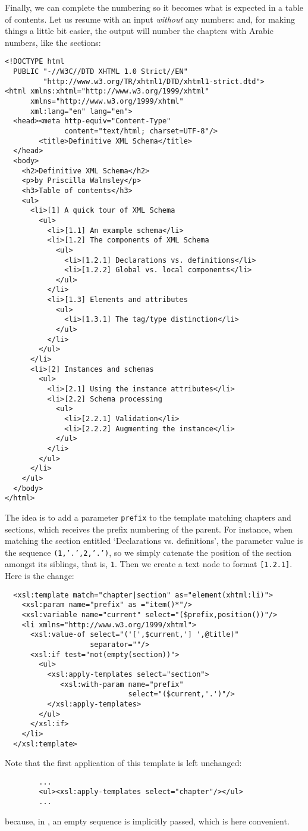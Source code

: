 Finally, we can complete the numbering so it becomes what is expected
in a table of contents. Let us resume with an input \emph{without} any
numbers:
\noindent and, for making things a little bit easier, the output will
number the chapters with Arabic numbers, like the sections:
\begin{verbatim}
<!DOCTYPE html
  PUBLIC "-//W3C//DTD XHTML 1.0 Strict//EN" 
         "http://www.w3.org/TR/xhtml1/DTD/xhtml1-strict.dtd">
<html xmlns:xhtml="http://www.w3.org/1999/xhtml" 
      xmlns="http://www.w3.org/1999/xhtml"
      xml:lang="en" lang="en">
  <head><meta http-equiv="Content-Type"
              content="text/html; charset=UTF-8"/>
        <title>Definitive XML Schema</title>
  </head>
  <body>
    <h2>Definitive XML Schema</h2>
    <p>by Priscilla Walmsley</p>
    <h3>Table of contents</h3>
    <ul>
      <li>[1] A quick tour of XML Schema
        <ul>
          <li>[1.1] An example schema</li>
          <li>[1.2] The components of XML Schema
            <ul>
              <li>[1.2.1] Declarations vs. definitions</li>
              <li>[1.2.2] Global vs. local components</li>
            </ul>
          </li>
          <li>[1.3] Elements and attributes
            <ul>
              <li>[1.3.1] The tag/type distinction</li>
            </ul>
          </li>
        </ul>
      </li>
      <li>[2] Instances and schemas
        <ul>
          <li>[2.1] Using the instance attributes</li>
          <li>[2.2] Schema processing
            <ul>
              <li>[2.2.1] Validation</li>
              <li>[2.2.2] Augmenting the instance</li>
            </ul>
          </li>
        </ul>
      </li>
    </ul>
  </body>
</html>
\end{verbatim}
The idea is to add a parameter \texttt{prefix} to the template
matching chapters and sections, which receives the prefix numbering of
the parent. For instance, when matching the section entitled
`Declarations vs. definitions', the parameter value is the sequence
\texttt{(1,'.',2,'.')}, so we simply catenate the position of the
section amongst its siblings, that is, \texttt{1}. Then we create a
text node to format \texttt{[1.2.1]}. Here is the change:
\begin{verbatim}
  <xsl:template match="chapter|section" as="element(xhtml:li)">
    <xsl:param name="prefix" as ="item()*"/>
    <xsl:variable name="current" select="($prefix,position())"/>
    <li xmlns="http://www.w3.org/1999/xhtml">
      <xsl:value-of select="('[',$current,'] ',@title)"
                    separator=""/>
      <xsl:if test="not(empty(section))">
        <ul>
          <xsl:apply-templates select="section">
             <xsl:with-param name="prefix"
                             select="($current,'.')"/>
          </xsl:apply-templates>
        </ul>
      </xsl:if>
    </li>
  </xsl:template>
\end{verbatim}
Note that the first application of this template is left unchanged:
\begin{verbatim}
        ...
        <ul><xsl:apply-templates select="chapter"/></ul>
        ...
\end{verbatim}
because, in \XSLT, an empty sequence is implicitly passed, which is
here convenient.


